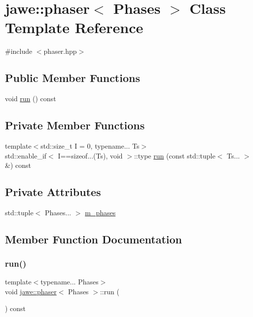 \hypertarget{classjawe_1_1phaser}{}\section{jawe\+:\+:phaser$<$ Phases $>$ Class Template Reference}
\label{classjawe_1_1phaser}


{\ttfamily \#include $<$phaser.\+hpp$>$}

\subsection*{Public Member Functions}
\begin{DoxyCompactItemize}
\item 
void \hyperlink{classjawe_1_1phaser_a8703078f2d472b978e291112850eb05d}{run} () const
\end{DoxyCompactItemize}
\subsection*{Private Member Functions}
\begin{DoxyCompactItemize}
\item 
{\footnotesize template$<$std\+::size\+\_\+t I = 0, typename... Ts$>$ }\\std\+::enable\+\_\+if$<$ I==sizeof...(Ts), void $>$\+::type \hyperlink{classjawe_1_1phaser_ab2331ed2fd0c314d637520d1679bd7f7}{run} (const std\+::tuple$<$ Ts... $>$ \&) const
\end{DoxyCompactItemize}
\subsection*{Private Attributes}
\begin{DoxyCompactItemize}
\item 
std\+::tuple$<$ Phases... $>$ \hyperlink{classjawe_1_1phaser_a14a41750a367d5ca484d1d3b6498c163}{m\+\_\+phases}
\end{DoxyCompactItemize}


\subsection{Member Function Documentation}
\mbox{\label{classjawe_1_1phaser_a8703078f2d472b978e291112850eb05d}} 
\subsubsection{\texorpdfstring{run()}{run()}\hspace{0.1cm}{\footnotesize\ttfamily [1/2]}}
{\footnotesize\ttfamily template$<$typename... Phases$>$ \\
void \hyperlink{classjawe_1_1phaser}{jawe\+::phaser}$<$ Phases $>$\+::run (\begin{DoxyParamCaption}{ }\end{DoxyParamCaption}) const\hspace{0.3cm}{\ttfamily [inline]}}

